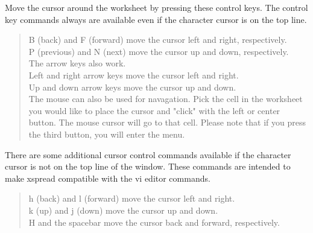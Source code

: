     Move the cursor around the worksheet by pressing these control keys.  The 
control key commands always are available even if the character cursor is on 
the top line.
\begin{quote}
    \ctrl B (back) and \ctrl F (forward) move the cursor left and right, respectively.\\
    \ctrl P (previous) and \ctrl N (next) move the cursor up and down, 
      respectively.\\

    The arrow keys also work.\\
    Left and right arrow keys move the cursor left and right.\\
    Up and down arrow keys move the cursor up and down.\\
    The mouse can also be used for navagation.  Pick the cell in the worksheet you
    would like to place the cursor and "click" with the left or center button.  The
    mouse cursor will go to that cell.  Please note that if you press the third
    button, you will enter the menu.\\
\end{quote}

    There are some additional cursor control commands available if the 
character cursor is not on the top line of the window.  These commands are 
intended to make xspread compatible with the vi editor commands.
\begin{quote}
    h (back) and l (forward) move the cursor left and right.\\
    k (up) and j (down) move the cursor up and down.\\
    \ctrl H and the spacebar move the cursor back and forward, respectively.\\
\end{quote}

